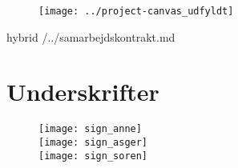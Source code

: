 \documentclass[12pt,fleqn,]{article}
\begin{document}

 

\begin{figure}[H]
	\centering
	\texttt{[image: ../project-canvas\_udfyldt]}
\end{figure}
\thispagestyle{empty}
\newpage 

\begin{markdown*}{hybrid}
/../samarbejdskontrakt.md
\end{markdown*}

\section{Underskrifter}
\begin{figure}[H]
	\centering
	\texttt{[image: sign\_anne]}\\
	\texttt{[image: sign\_asger]}\\
	\texttt{[image: sign\_soren]}
\end{figure}
\end{document}
